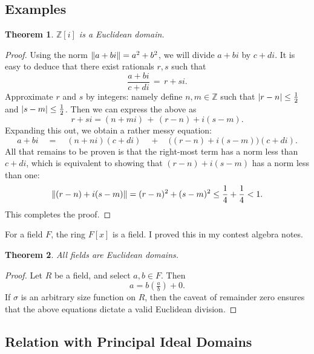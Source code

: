 \documentclass[11pt]{article}
\newtheorem{theorem}{Theorem}
\begin{document}
\subsection{Examples}

\begin{adjustwidth}{0.5cm}{}
  \begin{theorem}
    $\mathbb{Z}[i]$ is a Euclidean domain.
  \end{theorem}
  \begin{proof}
    Using the norm $\norm{a + bi} = a^{2} + b^{2}$, we will divide $a + bi$ by $c + di$. It is easy to deduce that there exist rationals $r, s$ such that
    \[
      \frac{a + bi}{c + di} \, = \, r + si.
    \]
    Approximate $r$ and $s$ by integers: namely define $n, m 
    \in \mathbb{Z}$ such that $\abs{r - n} \le \tfrac{1}{2}$ and $\abs{s - m} \le \tfrac{1}{2}$. Then we can express the above as
    \[
      r + si  = (n + mi ) \, + \, (r - n) + i(s - m).
    \]
    Expanding this out, we obtain a rather messy equation:
    \[
      a + bi \quad = \quad (n + ni )(c + di ) \quad + \quad \big( (r - n) + i(s - m)  \big)(c + di ).
    \]
    All that remains to be proven is that the right-most term has a norm less than $c + di$, which is equivalent to showing that $(r - n) + i (s - m) $ has a norm less than one:
    \[
      \norm{(r - n) + i(s - m) } = (r - n)^{2} + (s - m)^{2} \le \frac{1}{4} + \frac{1}{4} < 1.
    \]
    This completes the proof.
  \end{proof}
\end{adjustwidth}

For a field $F$, the ring $F[x]$ is a field. I proved this in my contest algebra notes.

\begin{adjustwidth}{0.5cm}{}
  \begin{theorem}
    All fields are Euclidean domains.
  \end{theorem}
  \begin{proof}
    Let $R$ be a field, and select $a, b \in F$. Then
    \[
      a = b \left( \tfrac{a}{b} \right) + 0.
    \]
    If $\sigma$ is an arbitrary size function on $R$, then the caveat of remainder zero ensures that the above equations dictate a valid Euclidean division.
  \end{proof}
\end{adjustwidth}


\subsection{Relation with Principal Ideal Domains}
\end{document}
